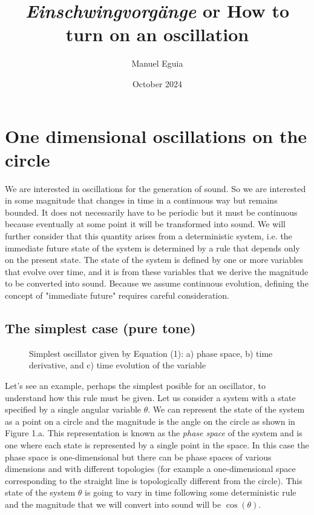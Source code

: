 \documentclass{article}
\title{{\em Einschwingvorgänge} or How to turn on an oscillation}
\author{Manuel Eguia}
\date{October 2024}
\begin{document}
\maketitle

\section{One dimensional oscillations on the circle}
We are interested in oscillations for the generation of sound. So we are interested in some magnitude that changes in time in a continuous way but remains bounded. It does not necessarily have to be periodic but it must be continuous because eventually at some point it will be transformed into sound.
We will further consider that this quantity arises from a deterministic system, i.e. the immediate future state of the system is determined by a rule that depends only on the present state. The state of the system is defined by one or more variables that evolve over time, and it is from these variables that we derive the magnitude to be converted into sound. 
Because we assume continuous evolution, defining the concept of "immediate future" requires careful consideration.



\subsection{The simplest case (pure tone)}

\begin{figure} [h]
    \centering
    \caption{Simplest oscillator given by Equation (1): a) phase space, b) time derivative, and c) time evolution of the variable} 
    \label{fig_pure}
\end{figure}

Let's see an example, perhaps the simplest posible for an oscillator, to understand how this rule must be given. 
Let us consider a system with a state specified by a single angular variable $\theta$. 
We can represent the state of the system as a point on a circle and the magnitude is the angle on the circle as shown in Figure 1.a.
This representation is known as the {\em phase space} of the system and is one where each state is represented by a single point in the space. 
In this case the phase space is one-dimensional but there can be phase spaces of various dimensions and with different topologies (for example a one-dimensional space corresponding to the straight line is topologically different from the circle).
This state of the system $\theta$ is going to vary in time following some deterministic rule and the magnitude that we will convert into sound will be $\cos(\theta)$.
\end{document}
